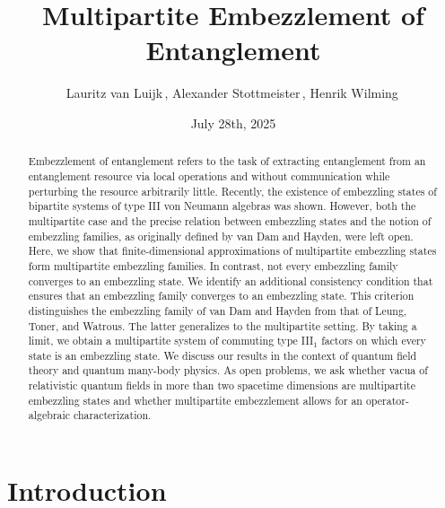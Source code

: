 \documentclass[a4paper, 10pt, onecolumn, accepted=2025-07-22]{quantumarticle}
\title{Multipartite Embezzlement of Entanglement}
\author{Lauritz van Luijk\,\orcidlink{0000-0003-3153-549X}, Alexander Stottmeister\,\orcidlink{0000-0002-0145-0877}, Henrik Wilming\,\orcidlink{0000-0002-0306-7679}}
\affiliation{Leibniz Universit\"at Hannover, Institut f\"ur Theoretische Physik,  \\ Appelstraße 2, 30167 Hannover, Germany}
\date{July 28th, 2025}
\theoremstyle{definition}
\newcommand*{\1}{\text{\usefont{U}{bbold}{m}{n}1}}
\begin{document}
\maketitle

\begin{abstract}
Embezzlement of entanglement refers to the task of extracting entanglement from an entanglement resource via local operations and without communication while perturbing the resource arbitrarily little. Recently, the existence of embezzling states of bipartite systems of type III von Neumann algebras was shown.
However, both the multipartite case and the precise relation between embezzling states and the notion of embezzling families, as originally defined by van Dam and Hayden, were left open. Here, we show that finite-dimensional approximations of multipartite embezzling states form multipartite embezzling families.
In contrast, not every embezzling family converges to an embezzling state.
We identify an additional consistency condition that ensures that an embezzling family converges to an embezzling state.
This criterion distinguishes the embezzling family of van Dam and Hayden from that of Leung, Toner, and Watrous.
The latter generalizes to the multipartite setting.
By taking a limit, we obtain a multipartite system of commuting type III$_1$ factors on which every state is an embezzling state.
We discuss our results in the context of quantum field theory and quantum many-body physics.
As open problems, we ask whether vacua of relativistic quantum fields in more than two spacetime dimensions are multipartite embezzling states and whether multipartite embezzlement allows for an operator-algebraic characterization.
\end{abstract}
\tableofcontents
\null



\section{Introduction}
\end{document}
